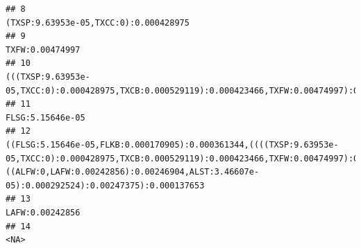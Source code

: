\documentclass[]{article}
\begin{document}
\begin{verbatim}
## 8                                                                                                                                                                                                                                                                                                                                                                                           (TXSP:9.63953e-05,TXCC:0):0.000428975
## 9                                                                                                                                                                                                                                                                                                                                                                                                                 TXFW:0.00474997
## 10                                                                                                                                                                                                                                                                                                                              (((TXSP:9.63953e-05,TXCC:0):0.000428975,TXCB:0.000529119):0.000423466,TXFW:0.00474997):0.00280452
## 11                                                                                                                                                                                                                                                                                                                                                                                                               FLSG:5.15646e-05
## 12                                                                                                                                                                                ((FLSG:5.15646e-05,FLKB:0.000170905):0.000361344,((((TXSP:9.63953e-05,TXCC:0):0.000428975,TXCB:0.000529119):0.000423466,TXFW:0.00474997):0.00280452,((ALFW:0,LAFW:0.00242856):0.00246904,ALST:3.46607e-05):0.000292524):0.00247375):0.000137653
## 13                                                                                                                                                                                                                                                                                                                                                                                                                LAFW:0.00242856
## 14                                                                                                                                                                                                                                                                                                                                                                                                                           <NA>

\end{verbatim}
\end{document}
